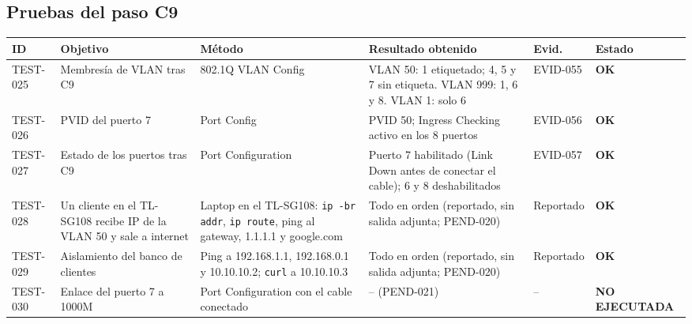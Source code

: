 \documentclass[11pt,a4paper]{article}
\newcommand{\estado}[1]{%
  \ifstrequal{#1}{COMPLETADA}{\textcolor{okgreen}{\textbf{\footnotesize #1}}}{%
  \ifstrequal{#1}{OPERATIVO VALIDADO}{\textcolor{okgreen}{\textbf{\footnotesize #1}}}{%
  \ifstrequal{#1}{OK}{\textcolor{okgreen}{\textbf{\footnotesize #1}}}{%
  \ifstrequal{#1}{RESUELTO}{\textcolor{okgreen}{\textbf{\footnotesize #1}}}{%
  \ifstrequal{#1}{EN CURSO}{\textcolor{amber}{\textbf{\footnotesize #1}}}{%
  \ifstrequal{#1}{REPORTADO}{\textcolor{amber}{\textbf{\footnotesize #1}}}{%
  \ifstrequal{#1}{NO EJECUTADA}{\textcolor{muted}{\textbf{\footnotesize #1}}}{%
  \ifstrequal{#1}{PROPUESTO}{\textcolor{violet}{\textbf{\footnotesize #1}}}{%
  \ifstrequal{#1}{PENDIENTE}{\textcolor{alertred}{\textbf{\footnotesize #1}}}{%
  \textbf{\footnotesize #1}}}}}}}}}}}
\newcommand{\cab}{\rowcolor{light}}
\begin{document}
\subsection{Pruebas del paso C9}
{\footnotesize\setlength{\tabcolsep}{4pt}
\begin{longtable}{L{1.6cm} L{2.75cm} L{3.1cm} L{3.2cm} L{1.6cm} L{2.35cm}}
  \toprule
  \cab\textbf{ID} & \textbf{Objetivo} & \textbf{Método} & \textbf{Resultado obtenido} & \textbf{Evid.} & \textbf{Estado}\\
  \midrule
  \endhead
  TEST-025 & Membresía de VLAN tras C9 & 802.1Q VLAN Config & VLAN 50: 1 etiquetado; 4, 5 y 7 sin etiqueta. VLAN 999: 1, 6 y 8. VLAN 1: solo 6 & EVID-055 & \estado{OK}\\
  TEST-026 & PVID del puerto 7 & Port Config & PVID 50; Ingress Checking activo en los 8 puertos & EVID-056 & \estado{OK}\\
  TEST-027 & Estado de los puertos tras C9 & Port Configuration & Puerto 7 habilitado (Link Down antes de conectar el cable); 6 y 8 deshabilitados & EVID-057 & \estado{OK}\\
  TEST-028 & Un cliente en el TL-SG108 recibe IP de la VLAN 50 y sale a internet & Laptop en el TL-SG108: \texttt{ip -br addr}, \texttt{ip route}, ping al gateway, 1.1.1.1 y google.com & Todo en orden (reportado, sin salida adjunta; PEND-020) & Reportado & \estado{OK}\\
  TEST-029 & Aislamiento del banco de clientes & Ping a 192.168.1.1, 192.168.0.1 y 10.10.10.2; \texttt{curl} a 10.10.10.3 & Todo en orden (reportado, sin salida adjunta; PEND-020) & Reportado & \estado{OK}\\
  TEST-030 & Enlace del puerto 7 a 1000M & Port Configuration con el cable conectado & -- (PEND-021) & -- & \estado{NO EJECUTADA}\\
  \bottomrule
\end{longtable}
}

\end{document}
